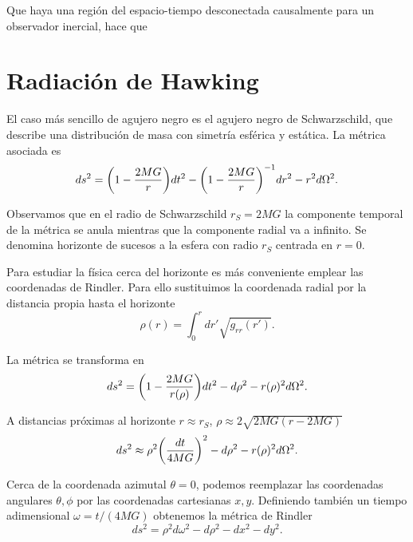 Que haya una región del espacio-tiempo desconectada causalmente para un observador inercial,
hace que 



\section{Radiación de Hawking}










El caso más sencillo de agujero negro es el agujero negro de Schwarzschild, que
describe una distribución de masa con simetría esférica y estática. La métrica asociada
es 
\begin{equation}
  ds^2= \qty(1-\frac{2MG}{r})dt^2-\qty(1-\frac{2MG}{r})^{-1}dr^2-r^2d\Omega^2.
\end{equation}

Observamos que en el radio de Schwarzschild $r_S=2MG$ la componente temporal de la 
métrica se anula mientras que la componente radial va a infinito.
Se denomina horizonte de sucesos a la esfera con radio $r_S$ centrada en $r=0$.

Para estudiar la física cerca del horizonte es más conveniente emplear las coordenadas
de Rindler. Para ello sustituimos la coordenada radial por la distancia propia hasta
el horizonte
\begin{equation}
  \rho(r)=\int_0^r dr' \sqrt{g_{rr}(r')}.
\end{equation}

La métrica se transforma en 
\begin{equation}
  ds^2=\qty(1-\frac{2MG}{r(\rho)})dt^2-d\rho^2-r(\rho)^2d\Omega^2.
\end{equation}

A distancias próximas al horizonte $r\approx r_S$, $\rho\approx 2\sqrt{2MG(r-2MG)}$
\begin{equation}
  ds^2\approx \rho^2\qty(\frac{dt}{4MG})^2 -d\rho^2-r(\rho)^2d\Omega^2.
\end{equation}

Cerca de la coordenada azimutal $\theta=0$, podemos reemplazar las coordenadas
angulares $\theta,\phi$ por las coordenadas cartesianas $x,y$. Definiendo
también un tiempo adimensional $\omega=t/(4MG)$ obtenemos la métrica de Rindler
\begin{equation}
  ds^2=\rho^2d\omega^2 -d\rho^2 -dx^2-dy^2.
\end{equation}

